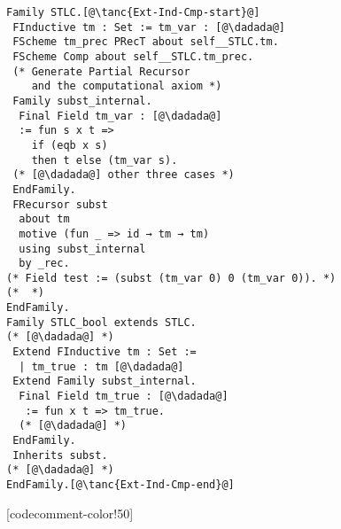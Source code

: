\begin{figure}

\begin{minipage}{\textwidth}
\begin{multicols}{2}


\begin{lstlisting}
Family STLC.[@\tanc{Ext-Ind-Cmp-start}@]
 FInductive tm : Set := tm_var : [@\dadada@] 
 FScheme tm_prec PRecT about self__STLC.tm.
 FScheme Comp about self__STLC.tm_prec.
 (* Generate Partial Recursor 
    and the computational axiom *)
 Family subst_internal. 
  Final Field tm_var : [@\dadada@]
  := fun s x t => 
    if (eqb x s) 
    then t else (tm_var s).
 (* [@\dadada@] other three cases *)
 EndFamily.
 FRecursor subst 
  about tm 
  motive (fun _ => id → tm → tm)
  using subst_internal
  by _rec.
(* Field test := (subst (tm_var 0) 0 (tm_var 0)). *)
(*  *)
EndFamily.
Family STLC_bool extends STLC.
(* [@\dadada@] *)
 Extend FInductive tm : Set :=
  | tm_true : tm [@\dadada@]
 Extend Family subst_internal.
  Final Field tm_true : [@\dadada@]
   := fun x t => tm_true.
  (* [@\dadada@] *)
 EndFamily. 
 Inherits subst.
(* [@\dadada@] *)
EndFamily.[@\tanc{Ext-Ind-Cmp-end}@]
\end{lstlisting}

[codecomment-color!50]

\columnbreak



\end{multicols}
\end{minipage}
\end{figure}
